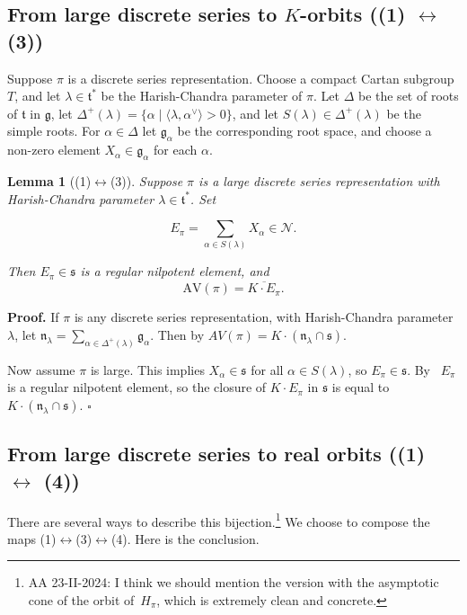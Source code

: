 \documentclass[10pt,leqno]{article}
\newtheorem{lemma}[equation]{Lemma}
\newcommand{\qed}{\hfill $\square$ \medskip}
\newenvironment{proof}[1][Proof]{\noindent\textbf{#1.} }{\qed}
\newcommand{\N}{\mathcal N}
\newcommand{\n}{\mathfrak n}
\newcommand{\ch}[1]{#1^\vee}
\renewcommand{\t}{\mathfrak t}
\newcommand{\g}{\mathfrak g}
\newcommand{\s}{\mathfrak s}
\newcommand{\AV}{\mathrm{AV}}
\begin{document}
\subsection{From large discrete series to $K$-orbits ((1) $\leftrightarrow$ (3))}

Suppose $\pi$ is a  discrete series representation. Choose a compact Cartan subgroup $T$, and let
$\lambda\in\t^*$ be the Harish-Chandra parameter of $\pi$. Let $\Delta$ be the set of roots of $\t$ in $\g$, 
let $\Delta^+(\lambda)=\{\alpha\mid \langle\lambda,\ch\alpha\rangle>0\}$,
and let $S(\lambda)\in\Delta^+(\lambda)$ be the simple roots.
For $\alpha\in \Delta$ let $\g_\alpha$ be the corresponding root space, and choose a non-zero element $X_\alpha\in\g_\alpha$ for each $\alpha$.

\begin{lemma}[(1)$\leftrightarrow$(3)]\label{l:pi_to_av}
Suppose $\pi$ is a large discrete series representation with Harish-Chandra parameter $\lambda\in\t^*$.
Set

\begin{equation}
  \label{e:Epi}
  E_\pi=\sum_{\alpha\in S(\lambda)}X_\alpha\in \N.
\end{equation}

Then $E_\pi\in\s$ is a regular nilpotent element, and
$$
\AV(\pi)=\overline{K\cdot E_\pi}.
$$
\end{lemma}

\begin{proof}
If $\pi$ is any discrete series representation, with Harish-Chandra parameter $\lambda$, let
$\n_{\lambda}=\sum_{\alpha\in\Delta^+(\lambda)}\g_\alpha$.
Then by \cite[Proposition 6.8]{vogan_irreducibility} $AV(\pi)=K\cdot(\n_\lambda\cap\s)$. 

Now assume $\pi$ is large. This implies $X_\alpha\in\s$ for all $\alpha\in S(\lambda)$, so $E_\pi\in \s$. 
By~\cite{kostant_tds} $E_\pi$ is a regular nilpotent element, so the closure of $K\cdot E_\pi$ in $\s$ is equal to $K\cdot(\n_\lambda\cap\s)$. 
\end{proof}




\subsection{From large discrete series to real orbits ((1) $\leftrightarrow$ (4))}


There are several ways to describe this bijection.\footnote{AA 23-II-2024: I think we should mention the version with the asymptotic cone of the orbit of~$H_\pi$, which is extremely clean and concrete. } We choose to compose the maps (1)$\leftrightarrow$(3)$\leftrightarrow$(4).
Here is the conclusion.
\end{document}
